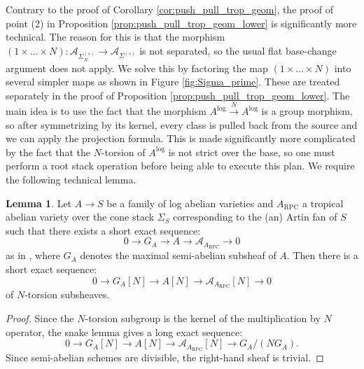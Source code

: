 \documentclass[11pt]{article}
\def\RPC{\mathrm{RPC}}
\renewcommand{\log}{\mathrm{log}}
\newcommand{\logA}{{A^{\log}}}
\theoremstyle{definition}
\newtheorem{lemma}[definition]{Lemma}
\begin{document}
Contrary to the proof of Corollary \ref{cor:push_pull_trop_geom},
the proof of point (2) in Proposition \ref{prop:push_pull_trop_geom_lower} is
significantly more technical. The reason for this is that the
morphism $(1\times\dots\times N):\mathcal{A}_{\Sigma_{N}^{(s)}}\to \mathcal{A}_{\Sigma^{(s)}}$
is not separated, so the usual flat base-change argument does not
apply. We solve this by factoring the map
$(1\times\dots\times N)$ into several simpler maps as shown
in Figure \ref{fig:Sigma_prime}. These are treated separately
in the proof of Proposition \ref{prop:push_pull_trop_geom_lower}.
The main idea is to use the fact that the morphism
$\logA\xrightarrow{N} \logA$ is a group morphism, so after symmetrizing
by its kernel, every class is pulled back from the source and we
can apply the projection formula. This is made significantly more
complicated by the fact that the $N$-torsion of $\logA$ is not
strict over the base, so one must perform a root stack operation
before being able to execute this plan.
We require the following technical lemma.

\begin{lemma}\label{lem:surj_mult_N}
	Let $A\to S$ be a family of log abelian varieties and $A_{\RPC}$ a tropical abelian variety over the cone stack $\Sigma_S$ corresponding
	to the (an) Artin fan of $S$ such that there
	exists a short exact sequence:
	$$
    0\to G_A\to A\to \mathcal{A}_{A_{\RPC}}\to 0
    $$
	as in \cite[4.1.2]{KKN2}, where $G_A$ denotes the maximal semi-abelian
	subsheaf of $A$. Then there is a short exact sequence:
	$$
    0\to G_A[N]\to A[N]\to \mathcal{A}_{A_{\RPC}}[N]\to 0
    $$
	of $N$-torsion subsheaves.
\end{lemma}

\begin{proof}
	Since the $N$-torsion subgroup is the kernel of the multiplication
	by $N$ operator, the snake lemma gives a long exact sequence:
	$$0\to G_A[N]\to A[N]\to \mathcal{A}_{A_{\RPC}}[N]\to G_A/(NG_A).$$
	Since semi-abelian schemes are divisible, the right-hand sheaf
	is trivial.
\end{proof}
\end{document}
